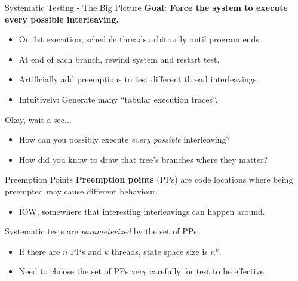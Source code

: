 \documentclass[xcolor=dvipsnames]{beamer}
\begin{document}
\begin{frame}{Systematic Testing - The Big Picture}
	\textbf{Goal: Force the system to execute every possible interleaving.}
	\begin{itemize}
		\item On 1st execution, schedule threads arbitrarily until program ends.
		\item At end of each branch, rewind system and restart test.
		\item Artificially add preemptions to test different thread interleavings.
		\item Intuitively: Generate many ``tabular execution traces''.
	\end{itemize}
	\pause
	\linegap

	Okay, wait a sec...
	\begin{itemize}
		\item How can you possibly execute {\em every possible} interleaving?
		\item How did you know to draw that tree's branches where they matter?
	\end{itemize}
\end{frame}

\begin{frame}{Preemption Points}
	\textbf{Preemption points} (PPs) are code locations where being preempted may cause different behaviour.
	\begin{itemize}
		\item IOW, somewhere that interesting interleavings can happen around.
	\end{itemize}
	\linegap

	Systematic tests are {\em parameterized} by the set of PPs.
	\begin{itemize}
		\item If there are $n$ PPs and $k$ threads, state space size is $n^k$.
		\item Need to choose the set of PPs very carefully for test to be effective.
	\end{itemize}
\end{frame}
\end{document}
